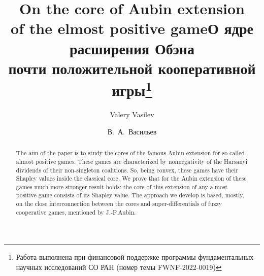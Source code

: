 \begin{englishtitle} %
\title{On the core of Aubin extension \\ of the elmost positive game}
\author{Valery Vasilev 
}
\institute{Sobolev Institute of Mathematics, Novosibirsk, Russia \\
\email{vasilev@math.nsc.ru}
}
\maketitle
\begin{abstract}
The aim of the paper is to study the cores of the
famous Aubin extension for so-called almost positive games.
These games are characterized by nonnegativity of the
Harsanyi dividends of their non-singleton coalitions. So, being convex, these games have their
Shapley values inside the classical core. We prove that for the Aubin extension of these games
much more stronger result holds: the core of this
extension of any almost positive game consists of its Shapley value. The approach we develop
is based, mostly, on the close interconnection between the cores and super-differentials of fuzzy
cooperative games, mentioned by J.-P.Aubin.

\end{abstract}
\end{englishtitle}

\iffalse
\documentclass[12pt]{llncs}


\usepackage{iftex}

\ifPDFTeX
\usepackage[T2A]{fontenc}
\usepackage[utf8]{inputenc} %
\usepackage[english,russian]{babel}
\fi

\usepackage{todonotes}

\usepackage[russian]{nla}


\fi


\title{О ядре расширения Обэна \\ почти положительной кооперативной игры\thanks{Работа выполнена при финансовой поддержке программы фундаментальных научных исследований СО РАН (номер темы FWNF-2022-0019)}}
\author{В.~А.~Васильев   %
} %


